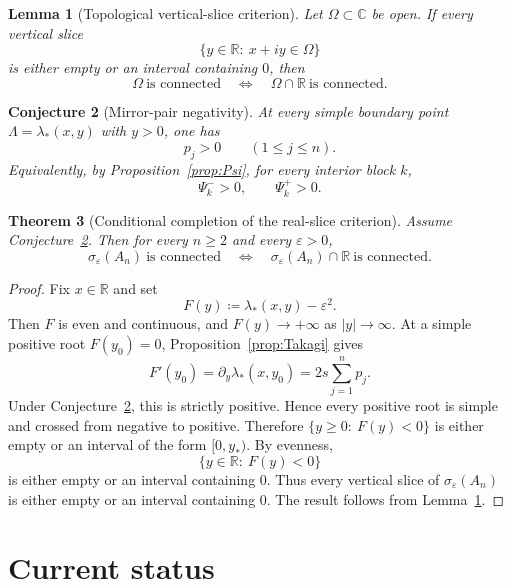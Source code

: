 \documentclass[11pt]{article}
\newtheorem{theorem}{Theorem}[section]
\newtheorem{lemma}[theorem]{Lemma}
\newtheorem{conjecture}[theorem]{Conjecture}
\newcommand{\C}{\mathbb C}
\newcommand{\R}{\mathbb R}
\newcommand{\eps}{\varepsilon}
\begin{document}
\begin{lemma}[Topological vertical-slice criterion]\label{lem:topological}
Let \(\Omega\subset\C\) be open. If every vertical slice
\[
\{y\in\R:\ x+iy\in\Omega\}
\]
is either empty or an interval containing \(0\), then
\[
\Omega\ \text{is connected}
\quad\Longleftrightarrow\quad
\Omega\cap\R\ \text{is connected}.
\]
\end{lemma}

\begin{conjecture}[Mirror-pair negativity]\label{conj:mirror}
At every simple boundary point \(\Lambda=\lambda_*(x,y)\) with \(y>0\), one has
\[
p_j>0
\qquad (1\le j\le n).
\]
Equivalently, by Proposition~\ref{prop:Psi}, for every interior block \(k\),
\[
\Psi_k^- >0,
\qquad
\Psi_k^+ >0.
\]
\end{conjecture}

\begin{theorem}[Conditional completion of the real-slice criterion]\label{thm:conditional}
Assume Conjecture~\ref{conj:mirror}. Then for every \(n\ge 2\) and every \(\eps>0\),
\[
\sigma_\eps(A_n)\ \text{is connected}
\quad\Longleftrightarrow\quad
\sigma_\eps(A_n)\cap\R\ \text{is connected}.
\]
\end{theorem}

\begin{proof}
Fix \(x\in\R\) and set
\[
F(y)\coloneqq \lambda_*(x,y)-\eps^2.
\]
Then \(F\) is even and continuous, and \(F(y)\to+\infty\) as \(|y|\to\infty\).
At a simple positive root \(F(y_0)=0\), Proposition~\ref{prop:Takagi} gives
\[
F'(y_0)=\partial_y \lambda_*(x,y_0)=2s\sum_{j=1}^n p_j.
\]
Under Conjecture~\ref{conj:mirror}, this is strictly positive. Hence every positive root is
simple and crossed from negative to positive. Therefore \(\{y\ge 0:\ F(y)<0\}\) is either
empty or an interval of the form \([0,y_*)\). By evenness,
\[
\{y\in\R:\ F(y)<0\}
\]
is either empty or an interval containing \(0\). Thus every vertical slice of
\(\sigma_\eps(A_n)\) is either empty or an interval containing \(0\). The result follows from
Lemma~\ref{lem:topological}.
\end{proof}

\section{Current status}
\end{document}
